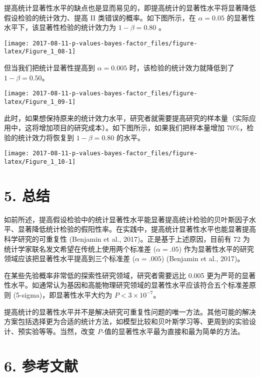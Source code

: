 \documentclass[]{article}
\begin{document}
提高统计显著性水平的缺点也是显而易见的，即提高统计的显著性水平将显著降低假设检验的统计效力、提高
II 类错误的概率。如下图所示，在 \(\alpha=0.05\)
的显著性水平下，该显著性检验的统计效力为 \(1-\beta=0.80\) 。

\begin{center}\texttt{[image: 2017-08-11-p-values-bayes-factor\_files/figure-latex/Figure\_1\_08-1]} \end{center}

但当我们把统计显著性提高到 \(\alpha=0.005\)
时，该检验的统计效力就降低到了 \(1-\beta=0.50\)。

\begin{center}\texttt{[image: 2017-08-11-p-values-bayes-factor\_files/figure-latex/Figure\_1\_09-1]} \end{center}

此时，如果想保持原来的统计效力水平，研究者就需要提高研究的样本量（实际应用中，这将增加项目的研究成本）。如下图所示，如果我们把样本量增加
70\%，检验的统计效力将恢复到 \(1-\beta=0.80\) 的水平。

\begin{center}\texttt{[image: 2017-08-11-p-values-bayes-factor\_files/figure-latex/Figure\_1\_10-1]} \end{center}

\hypertarget{summary}{%
\section{5. 总结}\label{summary}}

如前所述，提高假设检验中的统计显著性水平能显著提高统计检验的贝叶斯因子水平、显著降低统计检验的假阳性率。在实践中，提高统计显著性水平也能显著提高科学研究的可重复性
(Benjamin et al., 2017)。正是基于上述原因，目前有 72
为统计学家联名发文希望在传统上使用两个标准差 (\(\alpha = .05\))
作为显著性水平的研究领域应该把显著性水平提高到三个标准差
(\(\alpha = .005\)) (Benjamin et al., 2017)。

在某些先验概率非常低的探索性研究领域，研究者需要远比 0.005
更为严苛的显著性水平。如通常认为基因和高能物理研究领域的显著性水平应该符合五个标准差原则
(5-sigma)，即显著性水平大约为 \(P < 3\times 10^{-7}\)。

提高统计的显著性水平并不是解决研究可重复性问题的唯一方法。其他可能的解决方案包括选择更为合适的统计方法，如模型比较和贝叶斯学习等、更周到的实验设计、预实验等等。当然，改变
\emph{P}-值的显著性水平最为直接和最为简单的方法。

\hypertarget{references}{%
\section{6. 参考文献}\label{references}}
\end{document}
